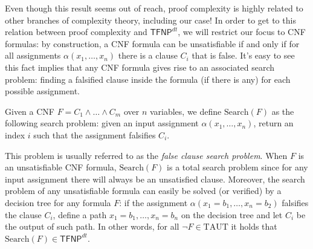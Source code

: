 Even though this result seems out of reach, proof complexity is highly related to other branches of complexity theory, including our case! In order to get to this relation between proof complexity and $\mathsf{TFNP}^{dt}$, we will restrict our focus to CNF formulas: by construction, a CNF formula can be unsatisfiable if and only if for all assignments $\alpha(x_1, \ldots, x_n)$ there is a clause $C_i$ that is false. It's easy to see this fact implies that any CNF formula gives rise to an associated search problem: finding a falsified clause inside the formula (if there is any) for each possible assignment.

\begin{definition}
 Given a CNF $F = C_1 \land \ldots \land C_m$ over $n$ variables, we define $\mathrm{Search}(F)$ as the following search problem: given an input assignment $\alpha(x_1, \ldots, x_n)$, return an index $i$ such that the assignment falsifies $C_i$.
\end{definition}

This problem is usually referred to as the \textit{false clause search problem}. 
When $F$ is an unsatisfiable CNF formula, $\mathrm{Search}(F)$ is a total search problem since for any input assignment there will always be an unsatisfied clause. Moreover, the search problem of any unsatisfiable formula can easily be solved (or verified) by a decision tree for any formula $F$: if the assignment $\alpha(x_1 = b_1, \ldots, x_n = b_2)$ falsifies the clause $C_i$, define a path $x_1 = b_1, \ldots, x_n = b_n$ on the decision tree and let $C_i$ be the output of such path. In other words, for all $\lnot F \in \mathrm{TAUT}$ it holds that $\mathrm{Search}(F) \in \mathsf{TFNP}^{dt}$. 

